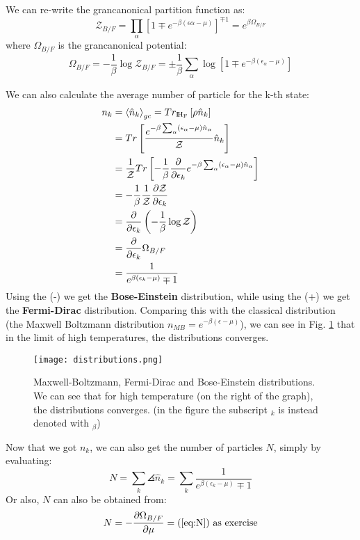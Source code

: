 We can re-write the grancanonical partition function as:
\begin{equation}\label{eq:grancanonical}
\mathcal Z_{B/F} = \prod_\alpha \left[1 \mp e^{-\beta (\epsilon\alpha -\mu)}\right]^{\mp 1} = e^{\beta\Omega_{B/F}}
\end{equation}
where $\Omega_{B/F}$ is the grancanonical potential:
$$ \Omega_{B/F} = -\frac 1\beta \log \mathcal Z_{B/F} = \pm \frac 1\beta\sum_\alpha \log\left[1 \mp e^{-\beta(\epsilon_\alpha - \mu)}\right]$$

We can also calculate the average number of particle for the k-th state:
\begin{align*}
    n_k &= \left<\hat n_k\right>_{gc} = Tr_{\rm I\!H_F}\left[\rho\hat n_k\right]\\
    &= Tr \left[\frac{e^{-\beta\sum_\alpha(\epsilon_\alpha-\mu)\hat n_\alpha}}{\mathcal Z} \hat n_k\right]\\
    &= \frac 1{\mathcal Z}Tr \left[-\frac1\beta \frac{\partial}{\partial\epsilon_k}e^{-\beta\sum_\alpha(\epsilon_\alpha-\mu)\hat n_\alpha}\right] \\
    &= -\frac1\beta \frac 1{\mathcal Z}\frac{\partial\mathcal Z}{\partial\epsilon_k} \\
    &= \frac{\partial}{\partial\epsilon_k}\left(-\frac1\beta \log \mathcal{Z}\right) \\
    &= \frac{\partial}{\partial\epsilon_k}\Omega_{B/F}\\
    &=\frac 1{e^{\beta(\epsilon_k-\mu)}\mp 1}
\end{align*}
Using the (-) we get the \textbf{Bose-Einstein} distribution, while using the (+) we get the \textbf{Fermi-Dirac} distribution. Comparing this with the classical distribution (the Maxwell Boltzmann distribution $n_{MB} = e^{-\beta(\epsilon-\mu)}$), we can see in Fig. \ref{fig:distributions} that in the limit of high temperatures, the distributions converges.

 \begin{figure}[ht]
    \centering
    \texttt{[image: distributions.png]}
    \caption{Maxwell-Boltzmann, Fermi-Dirac and Bose-Einstein distributions. We can see that for high temperature (on the right of the graph), the distributions converges. (in the figure the subscript $_k$ is instead denoted with $_\beta$)}
    \label{fig:distributions}
\end{figure}

Now that we got $ n_k$, we can also get the number of particles $N$, simply by evaluating:
\begin{equation}\label{eq:N}
    N = \sum_k \angles{\hat n_k} = \sum_k \frac1{e^{\beta(\epsilon_k-\mu)}\mp 1}
\end{equation} 
Or also, $N$ can also be obtained from:
$$ N = -\frac{\partial\Omega_{B/F}}{\partial\mu} = (\ref{eq:N}) \text{ as exercise}$$

